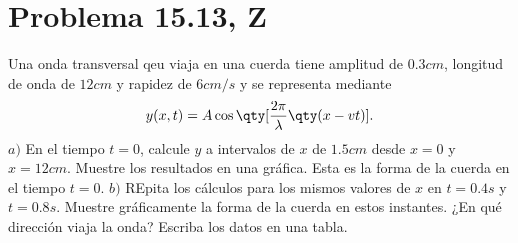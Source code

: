 \section*{Problema 15.13, Z}

\noindent Una onda transversal qeu viaja en una cuerda tiene amplitud de $0.3 cm$, longitud de onda de $12cm$ y rapidez de $6cm/s$ y se representa mediante 
	$$ y(x,t) = A\cos{\qty[\frac{2\pi}{\lambda} \qty(x - vt)]}. $$
\noindent $a)$ En el tiempo $t = 0$, calcule $y$ a intervalos de $x$ de $1.5cm$ desde $x = 0$ y $x = 12cm$. Muestre los resultados en una gráfica. Esta es la forma de la cuerda en el tiempo $t = 0$. $b)$ REpita los cálculos para los mismos valores de $x$ en $t = 0.4s$ y $t = 0.8s$. Muestre gráficamente la forma de la cuerda en estos instantes. ¿En qué dirección viaja la onda? Escriba los datos en una tabla.







